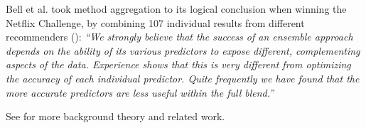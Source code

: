 Bell et al. took method aggregation to its logical conclusion when winning the Netflix Challenge,
by combining 107 individual results from different recommenders (\cite[p.6]{Bell2007}):
  \emph{``We strongly believe that the success of an ensemble approach depends on the ability of its various predictors to expose different, 
  complementing aspects of the data. Experience shows that this is very different from optimizing the accuracy of each individual predictor. 
  Quite frequently we have found that the more accurate predictors are less useful within the full blend.''}

See \cite{Bjorkoy2011} for more background theory and related work.
